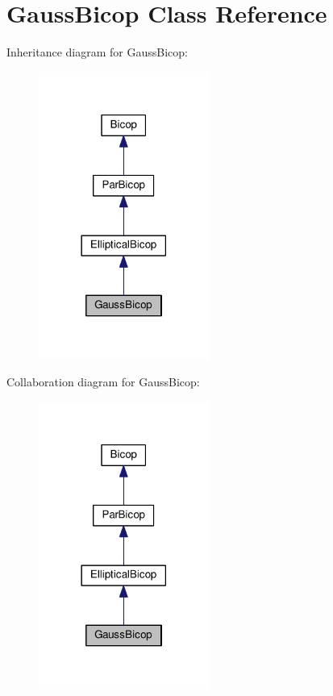 \hypertarget{class_gauss_bicop}{\section{Gauss\+Bicop Class Reference}
\label{class_gauss_bicop}
}


Inheritance diagram for Gauss\+Bicop\+:\nopagebreak
\begin{figure}[H]
\begin{center}
\leavevmode
\includegraphics[width=158pt]{class_gauss_bicop__inherit__graph}
\end{center}
\end{figure}


Collaboration diagram for Gauss\+Bicop\+:\nopagebreak
\begin{figure}[H]
\begin{center}
\leavevmode
\includegraphics[width=158pt]{class_gauss_bicop__coll__graph}
\end{center}
\end{figure}
